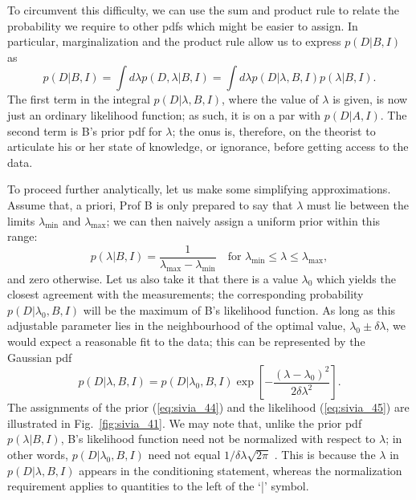 \documentclass[%
oneside,                 %
final,                   %
10pt]{article}
\begin{document}
To circumvent this difficulty, we can use the sum and product rule to relate the probability we require to other pdfs which might be easier to assign. In particular, marginalization and the product rule allow us to express $p(D | B , I )$ as
\begin{equation}
p(D|B,I) = \int d\lambda p(D,\lambda|B,I) = 
\int d\lambda p(D|\lambda,B,I) p(\lambda|B,I). 
\label{eq:sivia_43}
\end{equation}
The first term in the integral $p(D | \lambda, B , I )$, where the value of $\lambda$ is given, is now just an ordinary likelihood function; as such, it is on a par with $p(D|A,I)$. The second term is B’s prior pdf for $\lambda$; the onus is, therefore, on the theorist to articulate his or her state of knowledge, or ignorance, before getting access to the data.

To proceed further analytically, let us make some simplifying approximations. Assume that, a priori, Prof B is only prepared to say that $\lambda$ must lie between the limits $\lambda_\mathrm{min}$ and $\lambda_\mathrm{max}$; we can then naively assign a uniform prior within this range:
\begin{equation}
p(\lambda|B,I) = \frac{1}{\lambda_\mathrm{max}-\lambda_\mathrm{min}} \quad \text{for } \lambda_\mathrm{min} \leq \lambda \leq \lambda_\mathrm{max}, 
\label{eq:sivia_44}
\end{equation}
and zero otherwise. Let us also take it that there is a value $\lambda_0$ which yields the closest agreement with the measurements; the corresponding probability $p(D|\lambda_0,B,I)$ will be the maximum of B’s likelihood function. As long as this adjustable parameter lies in the neighbourhood of the optimal value, $\lambda_0 \pm \delta\lambda$, we would expect a reasonable fit to the data; this can be represented by the Gaussian pdf
\begin{equation}
p(D|\lambda,B,I) = p(D|\lambda_0,B,I) \exp \left[ − \frac{(\lambda−\lambda_0)^2}{2\delta\lambda^2} \right]. 
\label{eq:sivia_45}
\end{equation}
The assignments of the prior (\ref{eq:sivia_44}) and the likelihood (\ref{eq:sivia_45}) are illustrated in Fig.~\ref{fig:sivia_41}. We may note that, unlike the prior pdf $p(\lambda|B,I)$, B’s likelihood function need not be normalized with respect to $\lambda$; in other words, $p(D|\lambda_0,B,I)$ need not equal $1/ \delta\lambda \sqrt{2\pi}$ . This is because the $\lambda$ in $p(D|\lambda,B,I)$ appears in the conditioning statement, whereas the normalization requirement applies to quantities to the left of the ‘|’ symbol.
\end{document}
